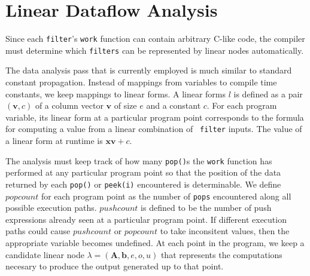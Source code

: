 \section{Linear Dataflow Analysis}
\label{sec:dataflow}

%
%
%


Since each {\tt filter}'s {\tt work} function can contain arbitrary
C-like code, the compiler must determine which {\tt filters} can be
represented by linear nodes automatically.
 
The data analysis pass that is currently employed is much similar to
standard constant propagation.  Instead of mappings from variables to
compile time constants, we keep mappings to linear forms.  A linear
forms $l$ is defined as a pair $({\mathbf v}, c)$ of a column vector
$\mathbf{v}$ of size $e$ and a constant $c$. For each program
variable, its linear form at a particular program point corresponds to
the formula for computing a value from a linear combination of {\tt
filter} inputs. The value of a linear form at runtime is ${\mathbf
x}{\mathbf v} + c$.

The analysis must keep track of how many {\tt pop()}s the {\tt work}
function has performed at any particular program point so that the
position of the data returned by each {\tt pop()} or {\tt peek(i)}
encountered is determinable. We define $popcount$ for each program
point as the number of {\tt pops} encountered along all possible
execution paths.  $pushcount$ is defined to be the number of push
expressions already seen at a particular program point.  If different
execution paths could cause $pushcount$ or $popcount$ to take
inconsitent values, then the appropriate variable becomes undefined.
At each point in the program, we keep a candidate linear node
$\lambda=({\mathbf A}, {\mathbf b}, e,o,u)$ that represents the
computations necesary to produce the output generated up to that
point.

